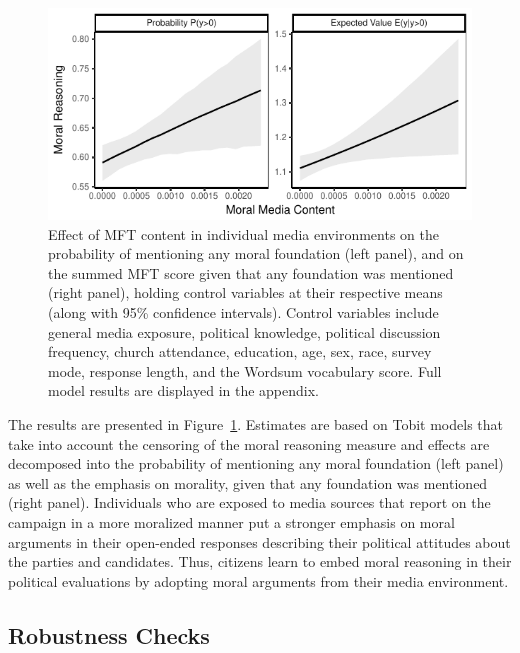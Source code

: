 \documentclass[12pt]{article}
\begin{document}
\begin{figure}[h]\centering
\includegraphics{../calc/fig/tobit_media.pdf}
\caption{Effect of MFT content in individual media environments on the probability of mentioning any moral foundation (left panel), and on the summed MFT score given that any foundation was mentioned (right panel), holding control variables at their respective means (along with 95\% confidence intervals). Control variables include general media exposure, political knowledge, political discussion frequency, church attendance, education, age, sex, race, survey mode, response length, and the Wordsum vocabulary score. Full model results are displayed in the appendix.
}\label{fig:tobit_media}
\end{figure}

The results are presented in Figure~\ref{fig:tobit_media}. Estimates are based on Tobit models that take into account the censoring of the moral reasoning measure and effects are decomposed into the probability of mentioning any moral foundation (left panel) as well as the emphasis on morality, given that any foundation was mentioned (right panel). Individuals who are exposed to media sources that report on the campaign in a more moralized manner put a stronger emphasis on moral arguments in their open-ended responses describing their political attitudes about the parties and candidates. Thus, citizens learn to embed moral reasoning in their political evaluations by adopting moral arguments from their media environment.



\subsection*{Robustness Checks}
\end{document}
